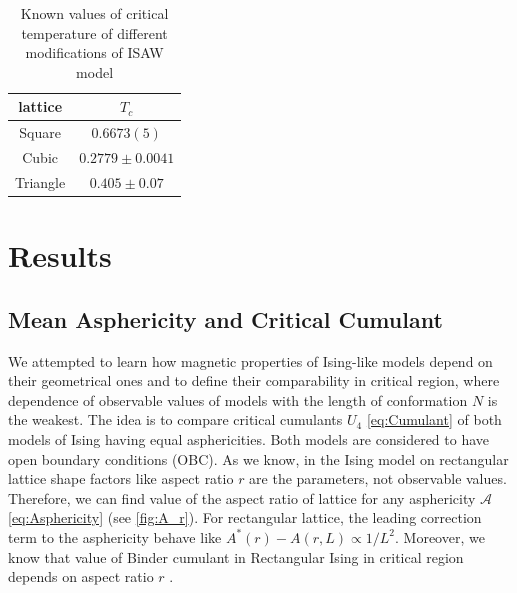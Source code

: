 \documentclass[a4paper]{jpconf}
\begin{document}
\begin{table}[h]
    \centering
    \begin{tabular}{|c|c|}
        \hline
        lattice & $T_{c}$ \\ \hline
        Square & $0.6673(5)$ \cite{Caracciolo2011} \\ \hline
        Cubic & $0.2779 \pm 0.0041$\cite{Tesi1996} \\ \hline
        Triangle & $ 0.405 \pm 0.07$\cite{Privman1986} \\ \hline
    \end{tabular}
    \caption{Known values of critical temperature of different modifications of ISAW model}
    \label{tab:ISAW_T_c}
\end{table}



\section{Results}

\subsection{Mean Asphericity and Critical Cumulant}


We attempted to learn how magnetic properties of Ising-like models depend on their geometrical ones and to define their comparability in critical region, where dependence of observable values of models with the length of conformation $N$ is the weakest. The idea is to compare critical cumulants $U_{4}$ \eqref{eq:Cumulant} of both models of Ising having equal asphericities. Both models are considered to have open boundary conditions (OBC). As we know, in the Ising model on rectangular lattice shape factors like aspect ratio $r$ are the parameters, not observable values. Therefore, we can find value of the aspect ratio of lattice for any asphericity $\mathcal{A}$ \eqref{eq:Asphericity} (see \cref{fig:A_r}). For rectangular lattice, the leading correction term to the asphericity behave like $A^{*}(r) - A(r, L) \propto 1 / L^{2}$. Moreover, we know that value of Binder cumulant in Rectangular Ising in critical region depends on aspect ratio $r$ \cite{Selke2006}. 
\end{document}
